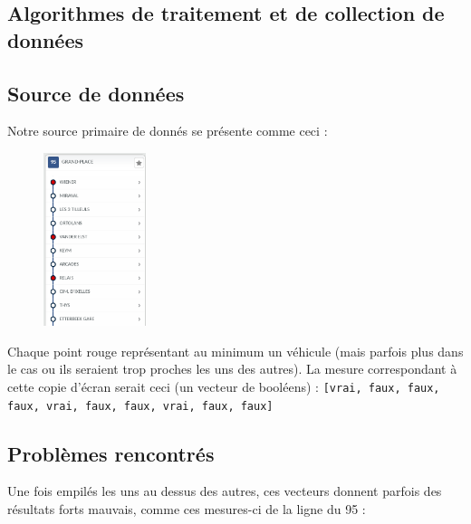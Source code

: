 \documentclass[letterpaper]{article}
\begin{document}
\newpage
\begin{appendices}
\section{Algorithmes de traitement et de collection de données}
\subsection{Source de données}
\label{align}
Notre source primaire de donnés se présente comme ceci :

\begin{figure}[h]
   \centerline{\includegraphics[width=3cm]{mstib.png}}
\end{figure}

Chaque point rouge représentant au minimum un véhicule (mais parfois plus dans le cas ou ils seraient trop proches les uns des autres). La mesure correspondant à cette copie d'écran serait ceci (un vecteur de booléens) : \texttt{[vrai, faux, faux, faux, vrai, faux, faux, vrai, faux, faux]}

\subsection{Problèmes rencontrés}

Une fois empilés les uns au dessus des autres, ces vecteurs donnent parfois des résultats forts mauvais, comme ces mesures-ci de la ligne du 95 :


\end{appendices}
\end{document}
